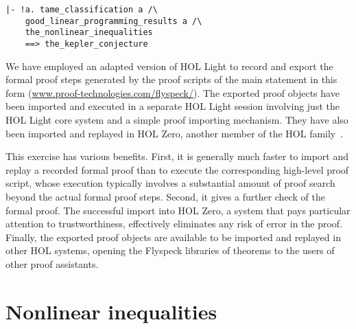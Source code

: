 \begin{obeylines}

\begin{verbatim}
|- !a. tame_classification a /\
    good_linear_programming_results a /\ 
    the_nonlinear_inequalities
    ==> the_kepler_conjecture
\end{verbatim}

\end{obeylines}

We have employed an adapted version of HOL Light to record and export
the formal proof steps generated by the proof scripts of the main
statement in this form (\url{www.proof-technologies.com/flyspeck/}).
The exported proof objects have been imported and executed in a
separate HOL Light session involving just the HOL Light core system
and a simple proof importing mechanism.  They have also been imported
and replayed in HOL Zero, another member of the HOL
family~\cite{adams2010introducing}.  


This exercise has various benefits.  First, it is generally much
faster to import and replay a recorded formal proof than to execute
the corresponding high-level proof script, whose execution typically
involves a substantial amount of proof search beyond the actual formal
proof steps. Second, it gives a further check of the formal proof.
The successful import into HOL
Zero, a system that pays particular attention to trustworthiness,
effectively eliminates any risk of error in the proof.
Finally, the exported proof objects are available to be imported and
replayed in other HOL systems, opening the Flyspeck libraries of
theorems to the users of other proof assistants.  



\section{Nonlinear inequalities}\label{sec:ni}

